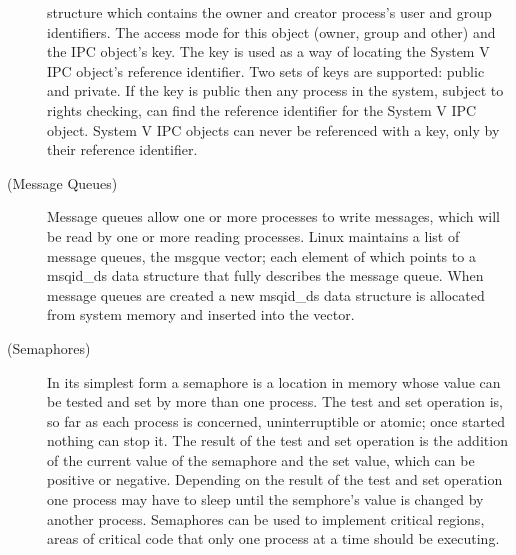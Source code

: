 \documentclass{article}
\begin{document}
\begin{description}
structure which contains the owner and creator process's user and group identifiers. The access mode for this object (owner, group and other) and the 
IPC object's key. The key is used as a way of locating the System V IPC object's reference identifier. Two sets of keys are supported: public and private. 
If the key is public then any process in the system, subject to rights checking, can find the reference identifier for the System V IPC object. System V 
IPC objects can never be referenced with a key, only by their reference identifier.
\item[(Message Queues)] Message queues allow one or more processes to write messages, which will be read by one or more reading processes. 
Linux maintains a list of message queues, the msgque vector; each element of which points to a msqid\_ds data structure that fully describes the message queue. 
When message queues are created a new msqid\_ds data structure is allocated from system memory and inserted into the vector.
\item[(Semaphores)] In its simplest form a semaphore is a location in memory whose value can be tested and set by more than one process. The test and set operation is, so far as each process is concerned, uninterruptible or atomic; once started nothing can stop it. The result of the test and set operation is the addition of the current value of the semaphore and the set value, which can be positive or negative. Depending on the result of the test and set operation one process may have to sleep until the semphore's value is changed by another process. Semaphores can be used to implement critical regions, areas of critical code that only one process at a time should be executing.


\end{description}
\end{document}
